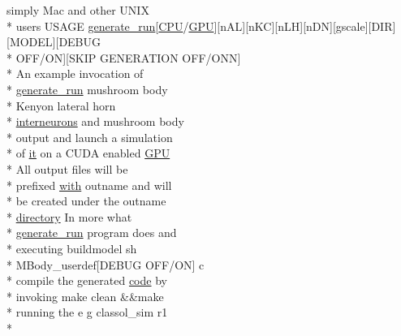 \begin{DoxyCompactItemize}
simply Mac and other U\+N\+I\+X \\*
users U\+S\+A\+G\+E \hyperlink{userproject_2MBody__userdef__project_2README_8txt_a320a215d1e27b4de394be70e90d22863}{generate\+\_\+run}\mbox{[}\hyperlink{README_8txt_a74a069e3c75797de2636c4dd14daa147}{C\+P\+U}/\hyperlink{modelSpec_8h_a39cb9803524b6f3b783344b2f89867b4}{G\+P\+U}\mbox{]}\mbox{[}n\+A\+L\mbox{]}\mbox{[}n\+K\+C\mbox{]}\mbox{[}n\+L\+H\mbox{]}\mbox{[}n\+D\+N\mbox{]}\mbox{[}gscale\mbox{]}\mbox{[}D\+I\+R\mbox{]}\mbox{[}M\+O\+D\+E\+L\mbox{]}\mbox{[}D\+E\+B\+U\+G \\*
O\+F\+F/O\+N\mbox{]}\mbox{[}S\+K\+I\+P G\+E\+N\+E\+R\+A\+T\+I\+O\+N O\+F\+F/O\+N\+N\mbox{]} \\*
An example invocation of \\*
\hyperlink{userproject_2MBody__userdef__project_2README_8txt_a320a215d1e27b4de394be70e90d22863}{generate\+\_\+run} mushroom body \\*
Kenyon lateral horn \\*
\hyperlink{userproject_2SynDelay__project_2README_8txt_adf6327d22e2c11a62a22ab5afd4f2b81}{interneurons} and mushroom body \\*
output and launch a simulation \\*
of \hyperlink{userproject_2PoissonIzh__project_2README_8txt_a3e3bbb6c9b14c38757cf273a117e43e8}{it} on a C\+U\+D\+A enabled \hyperlink{modelSpec_8h_a39cb9803524b6f3b783344b2f89867b4}{G\+P\+U} \\*
All output files will be \\*
prefixed \hyperlink{userproject_2OneComp__project_2README_8txt_ace09bb40fbf4457ad9a9340a67a4fa9a}{with} outname and will \\*
be created under the outname \\*
\hyperlink{README_8txt_ae619b68020535fba5ac79522a0d9d1c4}{directory} In more what \\*
\hyperlink{userproject_2MBody__userdef__project_2README_8txt_a320a215d1e27b4de394be70e90d22863}{generate\+\_\+run} program does and \\*
executing buildmodel sh \\*
M\+Body\+\_\+userdef\mbox{[}D\+E\+B\+U\+G O\+F\+F/O\+N\mbox{]} c \\*
compile the generated \hyperlink{userproject_2MBody__userdef__project_2README_8txt_aeec4e596748e7c29dd5548dae4c70685}{code} by \\*
invoking make clean \&\&make \\*
running the e g classol\+\_\+sim r1 \\*

\end{DoxyCompactItemize}
